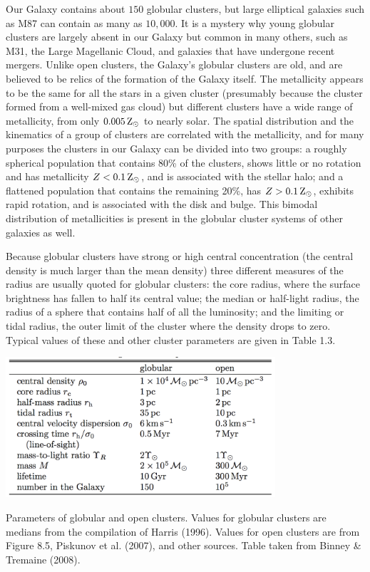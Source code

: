\documentclass[a4paper,11pt]{article}
\begin{document}
Our Galaxy contains about $150$ globular clusters, but large elliptical galaxies such as M87 can contain as many as $10,000$. It is a mystery why young globular clusters are largely absent in our Galaxy but common in many others, such as M31, the Large Magellanic Cloud, and galaxies that have undergone recent mergers. Unlike open clusters, the Galaxy's globular clusters are old, and are believed to be relics of the formation of the Galaxy itself. The metallicity appears to be the same for all the stars in a given cluster (presumably because the cluster formed from a well-mixed gas cloud) but different clusters have a wide range of metallicity, from only $0.005\,{\rm Z_\odot}$ to nearly solar. The spatial distribution and the kinematics of a group of clusters are correlated with the metallicity, and for many purposes the clusters in our Galaxy can be divided into two groups: a roughly spherical population that contains 80\% of the clusters, shows little or no rotation and has metallicity $Z<0.1\,{\rm Z_\odot}$, and is associated with the stellar halo; and a flattened population that contains the remaining 20\%, has $Z>0.1\,{\rm Z_\odot}$, exhibits rapid rotation, and is associated with the disk and bulge. This bimodal distribution of metallicities is present in the globular cluster systems of other galaxies as well.

{\noindent}Because globular clusters have strong or high central concentration (the central density is much larger than the mean density) three different measures of the radius are usually quoted for globular clusters: the core radius, where the surface brightness has fallen to half its central value; the median or half-light radius, the radius of a sphere that contains half of all the luminosity; and the limiting or tidal radius, the outer limit of the cluster where the density drops to zero. Typical values of these and other cluster parameters are given in Table 1.3.

\begin{table}[h!]
    \centering
    \includegraphics[width=10cm]{figures/GlobularClustersTable.png}
    \caption{\footnotesize{Parameters of globular and open clusters. Values for globular clusters are medians from the compilation of Harris (1996). Values for open clusters are from Figure 8.5, Piskunov et al. (2007), and other sources. Table taken from Binney \& Tremaine (2008).}}
    \label{fig:globularclusterstable}
\end{table}
\end{document}
